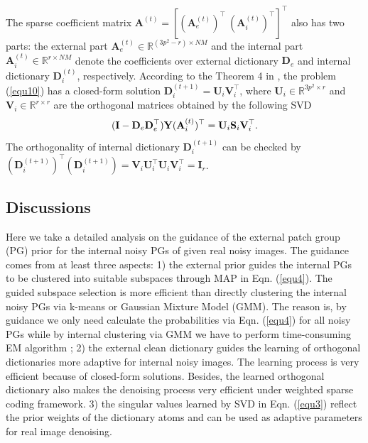 \documentclass[10pt,twocolumn,letterpaper]{article}
\begin{document}
The sparse coefficient matrix $\mathbf{A}^{(t)}=[(\mathbf{A}_{e}^{(t)})^{\top}\ (\mathbf{A}_{i}^{(t)})^{\top}]^{\top}$ also has two parts: the external part $\mathbf{A}_{e}^{(t)}\in\mathbb{R}^{(3p^2-r)\times NM}$ and the internal part $\mathbf{A}_{i}^{(t)}\in\mathbb{R}^{r\times NM}$ denote the coefficients over external dictionary $\mathbf{D}_{e}$ and internal dictionary $\mathbf{D}_{i}^{(t)}$, respectively. According to the Theorem 4 in \cite{spca}, the problem (\ref{equ10}) 
has a closed-form solution $\mathbf{D}_{i}^{(t+1)}=\mathbf{U}_{i}\mathbf{V}_{i}^{\top}$, where $\mathbf{U}_{i}\in\mathbb{R}^{3p^2\times r}$ and $\mathbf{V}_{i}\in\mathbb{R}^{r\times r}$ are the orthogonal matrices obtained by the following SVD
\vspace{-1mm}
\begin{equation}\label{equ11}\vspace{-2mm}
(\mathbf{I}-\mathbf{D}_{e}\mathbf{D}_{e}^{\top})\mathbf{Y}(\mathbf{A}_{i}^{(t)})^{\top}
=
\mathbf{U}_{i}\mathbf{S}_{i}\mathbf{V}_{i}^{\top}.
\end{equation}
The orthogonality of internal dictionary $\mathbf{D}_{i}^{(t+1)}$ can be checked by 
$(\mathbf{D}_{i}^{(t+1)})^{\top}(\mathbf{D}_{i}^{(t+1)})=\mathbf{V}_{i}\mathbf{U}_{i}^{\top}\mathbf{U}_{i}\mathbf{V}_{i}^{\top}=\mathbf{I}_{r}$.

\subsection{Discussions}

Here we take a detailed analysis on the guidance of the external patch group (PG) prior for the internal noisy PGs of given real noisy images. The guidance comes from at least three aspects: 1) the external prior guides the internal PGs to be clustered into suitable subspaces through MAP in Eqn. (\ref{equ4}). The guided subspace selection is more efficient than directly clustering the internal noisy PGs via k-means or Gaussian Mixture Model (GMM). The reason is, by guidance we only need calculate the probabilities via Eqn. (\ref{equ4}) for all noisy PGs while by internal clustering via GMM we have to perform time-consuming EM algorithm \cite{em}; 2) the external clean dictionary guides the learning of orthogonal dictionaries more adaptive for internal noisy images. The learning process is very efficient because of closed-form solutions. Besides, the learned orthogonal dictionary also makes the denoising process very efficient under weighted sparse coding framework. 3) the singular values learned by SVD in Eqn. (\ref{equ3}) reflect the prior weights of the dictionary atoms and can be used as adaptive parameters for real image denoising.
\end{document}
